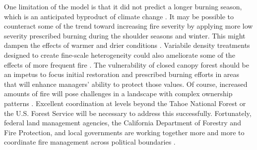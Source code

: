 One limitation of the model is that it did not predict a longer burning season, which is an anticipated byproduct of climate change \citep{Westerling2008,Stephens2013}. It may be possible to counteract some of the trend toward increasing fire severity by applying more low severity prescribed burning during the shoulder seasons and winter. This might dampen the effects of warmer and drier conditions \citep{Conard2003}. Variabile density treatments designed to create fine-scale heterogeneity could also ameliorate some of the effects of more frequent fire \citep{Stephens2010,Knapp2012,North2012a}. The vulnerability of closed canopy forest should be an impetus to focus initial restoration and prescribed burning efforts in areas that will enhance managers' ability to protect those values. Of course, increased amounts of fire will pose challenges in a landscape with complex ownership patterns \citep{Stephens2013}. Excellent coordination at levels beyond the Tahoe National Forest or the U.S. Forest Service will be necessary to address this successfully. Fortunately, federal land management agencies, the California Department of Forestry and Fire Protection, and local governments are working together more and more to coordinate fire management across political boundaries \citep{InteragencyAgreement2013}.

